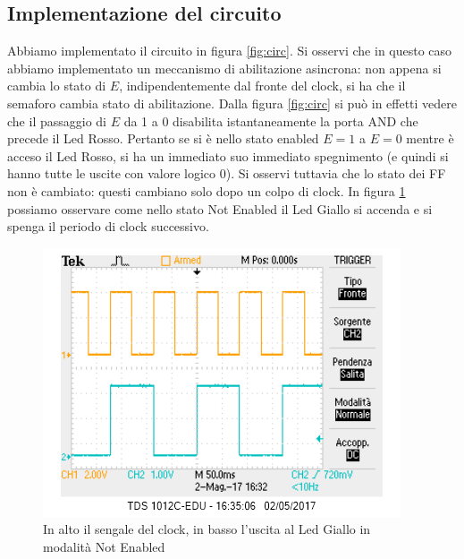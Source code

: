\documentclass[10pt,a4paper]{article}
\begin{document}
\subsection{Implementazione del circuito}
Abbiamo implementato il circuito in figura \ref{fig:circ}.
Si osservi che in questo caso abbiamo implementato un meccanismo di abilitazione asincrona: non appena si cambia lo stato di $E$, indipendentemente dal fronte del clock, si ha che il semaforo cambia stato di abilitazione.
Dalla figura \ref{fig:circ} si può in effetti vedere che il passaggio di $E$ da 1 a 0 disabilita istantaneamente la porta AND che precede il Led Rosso. Pertanto se si è nello stato enabled $E=1$ a $E=0$ mentre è acceso il Led Rosso, si ha un immediato suo immediato spegnimento (e quindi si hanno tutte le uscite con valore logico 0). Si osservi tuttavia che lo stato dei FF non è cambiato: questi cambiano solo dopo un colpo di clock.
In figura \ref{fig:lampeggiante} possiamo osservare come nello stato Not Enabled il Led Giallo si accenda e si spenga il periodo di clock successivo.
\begin{figure}
\centering
\includegraphics[scale=0.7]{ch1clock-ch2giallolamp.png}
\caption{In alto il sengale del clock, in basso l'uscita al Led Giallo in modalità Not Enabled\label{fig:lampeggiante}}
\end{figure} %
\end{document}
